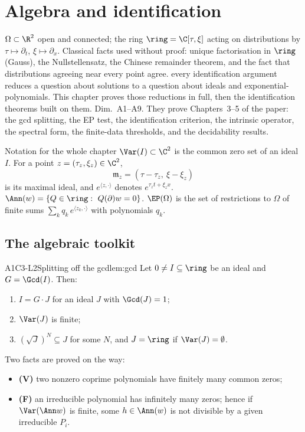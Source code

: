 \chapter{Algebra and identification}\label{ch:cI1}
\chapterbrief
{$\Omega\subset\R^2$ open and connected; the ring $\ring=\C[\tau,\xi]$ acting on distributions by $\tau\mapsto\partial_t$, $\xi\mapsto\partial_x$. Classical facts used without proof: unique factorisation in $\ring$ (Gauss), the Nullstellensatz, the Chinese remainder theorem, and the fact that distributions agreeing near every point agree.}
{every identification argument reduces a question about solutions to a question about ideals and exponential-polynomials. This chapter proves those reductions in full, then the identification theorems built on them.}
{Dim.~A1--A9. They prove Chapters~3--5 of the paper: the gcd splitting, the EP test, the identification criterion, the intrinsic operator, the spectral form, the finite-data thresholds, and the decidability results.}

\begin{notebox}{Notation for the whole chapter}
$\Var(I)\subset\C^2$ is the common zero set of an ideal $I$. For a point $z=(\tau_z,\xi_z)\in\C^2$,
\[
\mathfrak m_z=(\tau-\tau_z,\ \xi-\xi_z)
\]
is its maximal ideal, and $e^{\langle z,\cdot\rangle}$ denotes $e^{\tau_zt+\xi_zx}$. $\Ann(w)=\{Q\in\ring:\ Q(\partial)w=0\}$. $\EP(\Omega)$ is the set of restrictions to $\Omega$ of finite sums $\sum_kq_k\,e^{\langle z_k,\cdot\rangle}$ with polynomials $q_k$.
\end{notebox}

\section{The algebraic toolkit}

\begin{dimcard}{A1}{C3-L2}{Splitting off the gcd}{\proved}{lem:gcd}
Let $0\ne I\subseteq\ring$ be an ideal and $G=\Gcd(I)$. Then:
\begin{enumerate}[label=(\roman*)]
\item $I=G\cdot J$ for an ideal $J$ with $\Gcd(J)=1$;
\item $\Var(J)$ is finite;
\item $(\sqrt J)^N\subseteq J$ for some $N$, and $J=\ring$ if $\Var(J)=\emptyset$.
\end{enumerate}
Two facts are proved on the way:
\begin{itemize}
\item \textbf{(V)} two nonzero coprime polynomials have finitely many common zeros;
\item \textbf{(F)} an irreducible polynomial has infinitely many zeros; hence if $\Var(\Ann w)$ is finite, some $h\in\Ann(w)$ is not divisible by a given irreducible $P_i$.
\end{itemize}
\end{dimcard}

